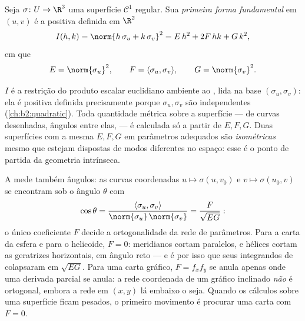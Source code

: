 \begin{definition}\label{def:b2:surfaces:fff}
Seja $\sigma \colon U \to \R^3$ uma superfície $\mathcal{C}^1$
regular. Sua \emph{primeira forma fundamental} em $(u,v)$ é a 
positiva definida em $\R^2$
\[
I(h, k) = \norm{h\,\sigma_u + k\,\sigma_v}^2
= E\,h^2 + 2F\,hk + G\,k^2,
\]
em que
\[
E = \norm{\sigma_u}^2,
\qquad
F = \langle \sigma_u, \sigma_v\rangle,
\qquad
G = \norm{\sigma_v}^2 .
\]
\end{definition}

\begin{remark}
$I$ é a restrição do produto escalar euclidiano ambiente ao
, lida na base $(\sigma_u, \sigma_v)$: ela é
positiva definida precisamente porque $\sigma_u, \sigma_v$ são
independentes (\cref{ch:b2:quadratic}). Toda quantidade métrica sobre a
superfície ---  de curvas desenhadas, ângulos entre elas,  ---
é calculada só a partir de $E, F, G$. Duas superfícies com a mesma $E,
F, G$ em parâmetros adequados são \emph{isométricas} mesmo que estejam
dispostas de modos diferentes no espaço: esse é o ponto de partida da geometria
intrínseca.
\end{remark}

\begin{example}\label{ex:b2:surfaces:coordangle}
A  mede também ângulos: as
curvas coordenadas $u \mapsto \sigma(u, v_0)$ e $v \mapsto
\sigma(u_0, v)$ se encontram sob o ângulo $\theta$ com
\[
\cos\theta = \frac{\langle\sigma_u,
\sigma_v\rangle}{\norm{\sigma_u}\,\norm{\sigma_v}}
= \frac{F}{\sqrt{EG}} :
\]
o único coeficiente $F$ decide a ortogonalidade da
rede de parâmetros. Para a carta da esfera e para o helicoide, $F =
0$: meridianos cortam paralelos, e hélices cortam as geratrizes
horizontais, em ângulo reto --- e é por isso que seus integrandos de
 colapsaram em $\sqrt{EG}$. Para uma carta gráfico,
$F = f_xf_y$ se anula apenas onde uma derivada parcial se anula:
a rede coordenada de um gráfico inclinado \emph{não} é
ortogonal, embora a rede em $(x, y)$ lá embaixo o seja. Quando os
cálculos sobre uma superfície ficam pesados, o primeiro movimento é
procurar uma carta com $F = 0$.
\end{example}


